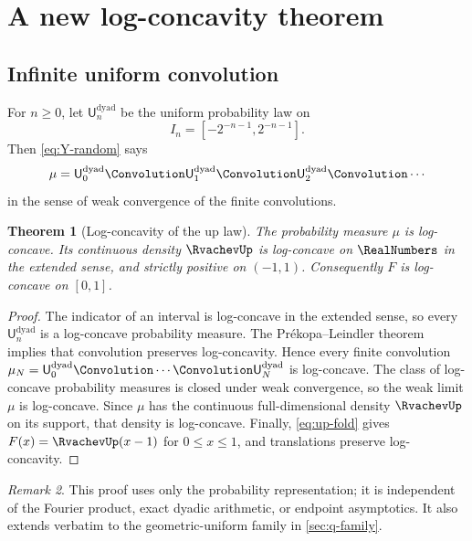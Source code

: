 \documentclass[11pt,oneside]{article}
\newtheorem{theorem}{Theorem}[section]
\theoremstyle{definition}
\theoremstyle{remark}
\newtheorem{remark}[theorem]{Remark}
\numberwithin{equation}{section}
\newcommand{\DyadicUniformLaw}[1]{\mathsf U^{\mathrm{dyad}}_{#1}}
\begin{document}
\section{A new log-concavity theorem}
\label{sec:logconcavity}

\subsection{Infinite uniform convolution}
For $n\ge0$, let $\DyadicUniformLaw{n}$ be the uniform probability law on
\[
 I_n=[-2^{-n-1},2^{-n-1}].
\]
Then \cref{eq:Y-random} says
\begin{equation}
 \mu=\DyadicUniformLaw{0}\Convolution\DyadicUniformLaw{1}
 \Convolution\DyadicUniformLaw{2}\Convolution\cdots
 \label{eq:infinite-convolution}
\end{equation}
in the sense of weak convergence of the finite convolutions.

\begin{theorem}[Log-concavity of the up law]
\label{thm:up-logconcave}
The probability measure $\mu$ is log-concave.  Its continuous density
$\RvachevUp$ is log-concave on $\RealNumbers$ in the extended sense, and strictly positive on
$(-1,1)$.  Consequently $F$ is log-concave on $[0,1]$.
\end{theorem}

\begin{proof}
The indicator of an interval is log-concave in the extended sense, so every
$\DyadicUniformLaw{n}$ is a log-concave probability measure.  The Pr\'ekopa--Leindler theorem~\cite{SaumardWellner}
implies that convolution preserves log-concavity.  Hence every finite
convolution $\mu_N=\DyadicUniformLaw{0}\Convolution\cdots
\Convolution\DyadicUniformLaw{N}$ is log-concave.  The class of
log-concave probability measures is closed under weak convergence, so the weak
limit $\mu$ is log-concave.  Since $\mu$ has the continuous full-dimensional
density $\RvachevUp$ on its support, that density is log-concave.  Finally,
\cref{eq:up-fold} gives $F(x)=\RvachevUp(x-1)$ for $0\le x\le1$, and translations
preserve log-concavity.
\end{proof}

\begin{remark}
This proof uses only the probability representation; it is independent of the
Fourier product, exact dyadic arithmetic, or endpoint asymptotics.  It also
extends verbatim to the geometric-uniform family in \cref{sec:q-family}.
\end{remark}
\end{document}
